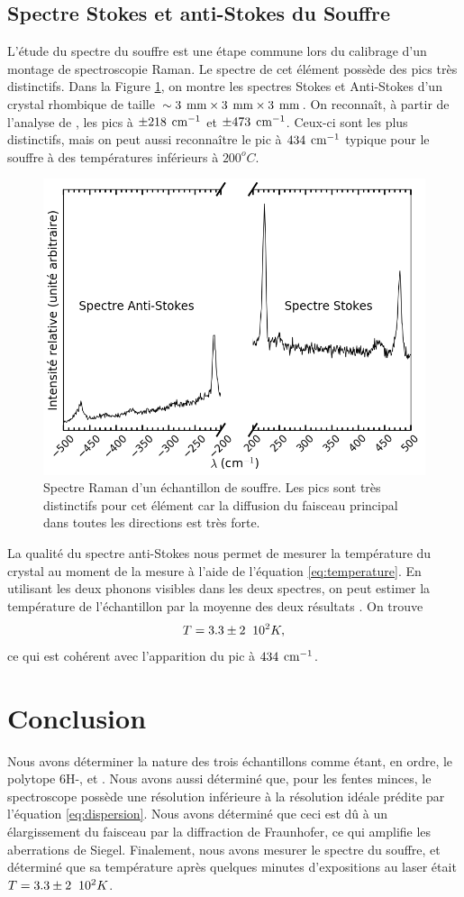 \documentclass[10pt,letterpaper,twocolumn]{article}
\newcommand{\s}{\hspace{0.1cm}}
\newcommand{\unit}[1]{\hspace{0.15cm}\text{#1}}
\begin{document}
\subsection{Spectre Stokes et anti-Stokes du Souffre}
L'étude du spectre du souffre est une étape commune lors du calibrage d'un montage de spectroscopie Raman. Le spectre de cet élément possède des pics très distinctifs. Dans la Figure \ref{fig:sulfure}, on montre les spectres Stokes et Anti-Stokes d'un crystal rhombique de taille $\sim 3\unit{mm}\times3\unit{mm}\times 3\unit{mm}$. On reconnaît, à partir de l'analyse de \citeauthor{Ward1968}\supercite{Ward1968}, les pics à $\pm218\unit{cm}^{-1}$ et $\pm473\unit{cm}^{-1}$. Ceux-ci sont les plus distinctifs, mais on peut aussi reconnaître le pic à $434\unit{cm}^{-1}$ typique pour le souffre à des températures inférieurs à $200^oC$\supercite{Ward1968}. 
\begin{figure}[H]
	\centering
	\includegraphics[width=0.8\linewidth]{figures/sulfure.png}
	\caption{Spectre Raman d'un échantillon de souffre. Les pics sont très distinctifs pour cet élément car la diffusion du faisceau principal dans toutes les directions est très forte. }
	\label{fig:sulfure}
\end{figure}
La qualité du spectre anti-Stokes nous permet de mesurer la température du crystal au moment de la mesure à l'aide de l'équation \ref{eq:temperature}. En utilisant les deux phonons visibles dans les deux spectres, on peut estimer la température de l'échantillon par la moyenne des deux résultats . On trouve $$T = 3.3 \pm 2\s\s 10^2K, $$ ce qui est cohérent avec l'apparition du pic à $434\unit{cm}^{-1}$. 


\section{Conclusion}\label{sec:conclusion} %
Nous avons déterminer la nature des trois échantillons comme étant, en ordre, le polytope 6H-,  et . Nous avons aussi déterminé que, pour les fentes minces, le spectroscope possède une résolution inférieure à la résolution idéale prédite par l'équation \ref{eq:dispersion}. Nous avons déterminé que ceci est dû à un élargissement du faisceau par la diffraction de Fraunhofer, ce qui amplifie les aberrations de Siegel. Finalement, nous avons mesurer le spectre du souffre, et déterminé que sa température après quelques minutes d'expositions au laser était $T = 3.3 \pm 2\s\s 10^2K$. 

\printbibliography
% 
%
\end{document}
